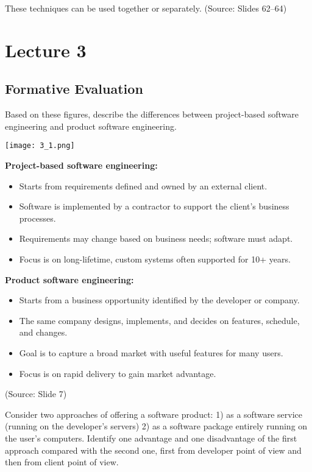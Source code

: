\documentclass[12pt]{article}
\begin{document}
These techniques can be used together or separately.
(Source: Slides 62--64)

\newpage
\section{Lecture 3}

\subsection{Formative Evaluation}

\begin{questionbox}
Based on these figures, describe the differences between project-based software engineering and product software engineering.

\begin{center}
\texttt{[image: 3\_1.png]}
\end{center}
\end{questionbox}



\textbf{Project-based software engineering:}
\begin{itemize}
    \item Starts from requirements defined and owned by an external client.
    \item Software is implemented by a contractor to support the client's business processes.
    \item Requirements may change based on business needs; software must adapt.
    \item Focus is on long-lifetime, custom systems often supported for 10+ years.
\end{itemize}

\textbf{Product software engineering:}
\begin{itemize}
    \item Starts from a business opportunity identified by the developer or company.
    \item The same company designs, implements, and decides on features, schedule, and changes.
    \item Goal is to capture a broad market with useful features for many users.
    \item Focus is on rapid delivery to gain market advantage.
\end{itemize}

(Source: Slide 7)

\begin{questionbox}
Consider two approaches of offering a software product: 1) as a software service (running on the developer's servers) 2) as a software package entirely running on the user's computers. Identify one advantage and one disadvantage of the first approach compared with the second one, first from developer point of view and then from client point of view.
\end{questionbox}
\end{document}
